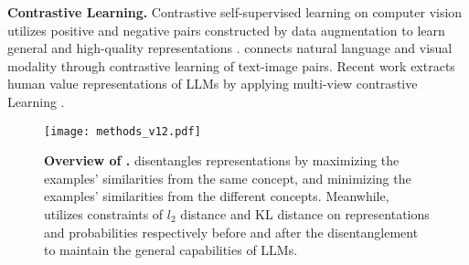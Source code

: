 \textbf{Contrastive Learning.} Contrastive self-supervised learning on computer vision utilizes positive and negative pairs constructed by data augmentation to learn general and high-quality representations \cite{he2020momentum,chen2020simple,zbontar2021barlow}. \citet{radford2021learning} connects natural language and visual modality through contrastive learning of text-image pairs. Recent work extracts human value representations of LLMs by applying multi-view contrastive Learning \cite{cahyawijaya2024high}. 


\begin{figure*}[t]
    \vspace{-5pt}
    \centering
    \texttt{[image: methods\_v12.pdf]}
    \vspace{-15pt}
    \caption{\textbf{Overview of \methodFamilyName{}.} \methodFamilyName{} disentangles representations by maximizing the examples' similarities from the same concept, and minimizing the examples' similarities from the different concepts. Meanwhile, \methodFamilyName{} utilizes constraints of $l_2$ distance and KL distance on representations and probabilities respectively before and after the disentanglement to maintain the general capabilities of LLMs. }\label{fig:method}
    \vspace{-10pt}
\end{figure*}